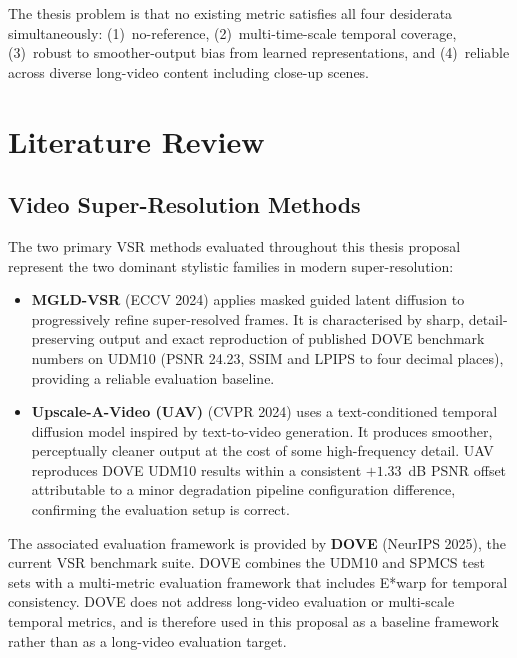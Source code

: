 The thesis problem is that no existing metric satisfies all four desiderata simultaneously:
(1)~no-reference, (2)~multi-time-scale temporal coverage, (3)~robust to smoother-output bias from
learned representations, and (4)~reliable across diverse long-video content including close-up scenes.

\section{Literature Review}
\label{sec:litreview}

\subsection{Video Super-Resolution Methods}

The two primary VSR methods evaluated throughout this thesis proposal represent the two
dominant stylistic families in modern super-resolution:

\begin{itemize}
    \item \textbf{MGLD-VSR} \cite{he_mgld_2024} (ECCV 2024) applies masked guided latent
          diffusion to progressively refine super-resolved frames. It is characterised by
          sharp, detail-preserving output and exact reproduction of published DOVE benchmark
          numbers on UDM10 (PSNR 24.23, SSIM and LPIPS to four decimal places), providing
          a reliable evaluation baseline.
    \item \textbf{Upscale-A-Video (UAV)} \cite{zhou_upscale_2024} (CVPR 2024) uses a
          text-conditioned temporal diffusion model inspired by text-to-video generation.
          It produces smoother, perceptually cleaner output at the cost of some
          high-frequency detail. UAV reproduces DOVE UDM10 results within a consistent
          $+1.33$~dB PSNR offset attributable to a minor degradation pipeline
          configuration difference, confirming the evaluation setup is correct.
\end{itemize}

The associated evaluation framework is provided by \textbf{DOVE} \cite{yang_dove_2024}
(NeurIPS 2025), the current VSR benchmark suite. DOVE combines the UDM10 and SPMCS test sets
with a multi-metric evaluation framework that includes E*warp for temporal consistency. DOVE
does not address long-video evaluation or multi-scale temporal metrics, and is therefore used
in this proposal as a baseline framework rather than as a long-video evaluation target.

